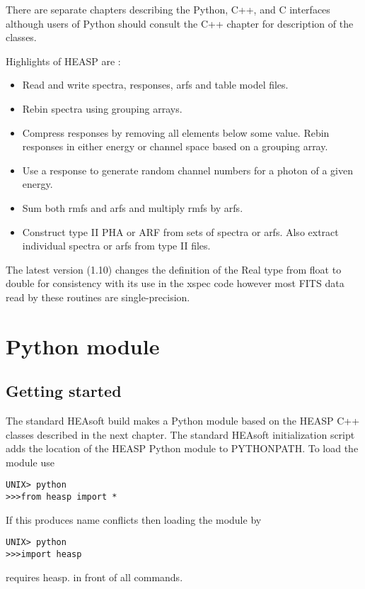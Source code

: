 \documentclass[11pt]{book}
\begin{document}
There are separate chapters describing the Python, C++, and C
interfaces although users of Python should consult the C++ chapter for
description of the classes.

Highlights of HEASP are :
\begin{itemize}

\item Read and write spectra, responses, arfs and table model files.

\item Rebin spectra using grouping arrays.

\item Compress responses by removing all elements below some
  value. Rebin responses in either energy or channel space based on a
  grouping array.

\item Use a response to generate random channel numbers for a photon
  of a given energy.

\item Sum both rmfs and arfs and multiply rmfs by arfs.

\item Construct type II PHA or ARF from sets of spectra or arfs. Also
  extract individual spectra or arfs from type II files.

\end{itemize}

The latest version (1.10) changes the definition of the Real type from
float to double for consistency with its use in the xspec code however
most FITS data read by these routines are single-precision.


\chapter{Python module}

\section{Getting started}

The standard HEAsoft build makes a Python module based on the HEASP
C++ classes described in the next chapter. The standard HEAsoft
initialization script adds the location of the HEASP Python module to
PYTHONPATH. To load the module use
\begin{verbatim}
UNIX> python
>>>from heasp import *
\end{verbatim}
If this produces name conflicts then loading the module by
\begin{verbatim}
UNIX> python
>>>import heasp
\end{verbatim}
requires heasp. in front of all commands.
\end{document}
